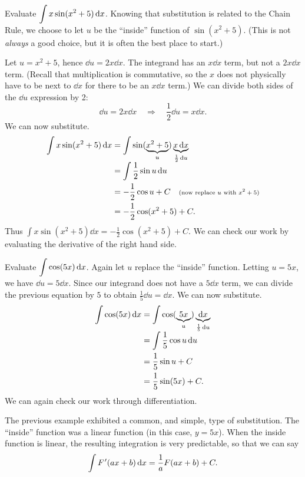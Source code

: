 \begin{example}\label{ex_sub1}%
Evaluate $\displaystyle \int x\sin(x^2+5)\operatorname{d}\! x$.
\solution
Knowing that substitution is related to the Chain Rule, we choose to let $u$ be the ``inside'' function of $\sin(x^2+5)$. (This is not \emph{always} a good choice, but it is often the best place to start.)

Let $u = x^2+5$, hence $\dd u = 2x\dd x$. The integrand has an $x\dd x$ term, but not a $2x\dd x$ term. (Recall that multiplication is commutative, so the $x$ does not physically have to be next to $\dd x$ for there to be an $x\dd x$ term.) We can divide both sides of the $\dd u$ expression by 2:
\[\dd u = 2x\dd x \quad \Rightarrow \quad \frac12\dd u = x\dd x.\]
We can now substitute.
\begin{align*}
	\int x\sin(x^2+5)\operatorname{d}\! x
	&= \int \sin(\underbrace{x^2+5}_u) \underbrace{x\operatorname{d}\! x}_{\frac12\operatorname{d}\! u}\\[-.3\baselineskip]
	&= \int \frac12\sin u\operatorname{d}\! u \\
	&= -\frac12\cos u + C \quad \text{\scriptsize (now replace $u$ with $x^2+5$)}\\
	&=-\frac12\cos(x^2+5) + C.
\end{align*}
Thus $\int x\sin(x^2+5)\dd x = -\frac12\cos(x^2+5)+C$. We can check our work by evaluating the derivative of the right hand side.
\end{example}

\begin{example}\label{ex_sub2}%
Evaluate $\displaystyle \int \cos(5x)\operatorname{d}\! x$.
\solution
Again let $u$ replace the ``inside'' function. Letting $u = 5x$, we have $\dd u = 5\dd x$. Since our integrand does not have a $5\dd x$ term, we can divide the previous equation by $5$ to obtain $\frac15\dd u = \dd x$. We can now substitute.
\begin{align*}
	\int \cos(5x)\operatorname{d}\! x
	&= \int \cos(\underbrace{5x}_u) \underbrace{\operatorname{d}\! x}_{\frac15\operatorname{d}\! u} \\[-.3\baselineskip]
	&=	\int \frac15\cos u \operatorname{d}\! u \\
	&= \frac15\sin u + C \\
	&= \frac15\sin (5x)+C.
\end{align*}
We can again check our work through differentiation.
\end{example}

The previous example exhibited a common, and simple, type of substitution. The ``inside'' function was a linear function (in this case, $y = 5x$). When the inside function is linear, the resulting integration is very predictable, so that we can say\vspace{-.3\baselineskip}
\[\int \Fp(ax+b)\dd x = \frac{1}{a}F(ax+b) + C.\]

